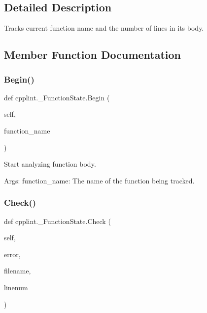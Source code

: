 \subsection{Detailed Description}
\begin{DoxyVerb}Tracks current function name and the number of lines in its body.\end{DoxyVerb}
 

\subsection{Member Function Documentation}
\mbox{\label{classcpplint_1_1__FunctionState_a41215c4d73baccbb340f6d0df1c1f4b3}} 
\subsubsection{\texorpdfstring{Begin()}{Begin()}}
{\footnotesize\ttfamily def cpplint.\+\_\+\+Function\+State.\+Begin (\begin{DoxyParamCaption}\item[{}]{self,  }\item[{}]{function\+\_\+name }\end{DoxyParamCaption})}

\begin{DoxyVerb}Start analyzing function body.

Args:
  function_name: The name of the function being tracked.
\end{DoxyVerb}
 \mbox{\label{classcpplint_1_1__FunctionState_a5e4ad7d7b104038b45204ab4abf527b2}} 
\subsubsection{\texorpdfstring{Check()}{Check()}}
{\footnotesize\ttfamily def cpplint.\+\_\+\+Function\+State.\+Check (\begin{DoxyParamCaption}\item[{}]{self,  }\item[{}]{error,  }\item[{}]{filename,  }\item[{}]{linenum }\end{DoxyParamCaption})}

